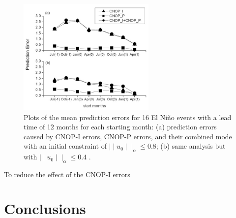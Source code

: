 \documentclass[12pt, onecolumn]{revtex4}    %
\begin{document}
\begin{figure}
\includegraphics[width=0.6\textwidth]{data/cnop}
\caption[CNOP]{Plots of the mean prediction errors for 16 El Ni\~{n}o events with a lead time of 12 months for each starting month: (a) prediction errors caused by CNOP-I errors, CNOP-P errors, and their combined mode with an initial constraint of $\mid \mid u_0 \mid \mid _\alpha \leq 0.8$; (b) same analysis but with $\mid \mid u_0 \mid \mid _\alpha \leq 0.4$ \citep{yu2012does}.}
\label{fig:cnop}
\end{figure}

To reduce the effect of the CNOP-I errors \\

\section{Conclusions}



\clearpage



\end{document}
